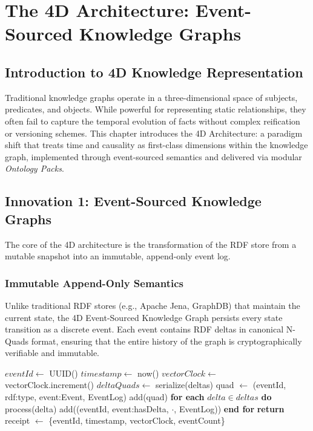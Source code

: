 \chapter{The 4D Architecture: Event-Sourced Knowledge Graphs}
\label{ch:architecture_4d}

\section{Introduction to 4D Knowledge Representation}

Traditional knowledge graphs operate in a three-dimensional space of subjects, predicates, and objects. While powerful for representing static relationships, they often fail to capture the temporal evolution of facts without complex reification or versioning schemes. This chapter introduces the 4D Architecture: a paradigm shift that treats time and causality as first-class dimensions within the knowledge graph, implemented through event-sourced semantics and delivered via modular \textit{Ontology Packs}.

\section{Innovation 1: Event-Sourced Knowledge Graphs}

The core of the 4D architecture is the transformation of the RDF store from a mutable snapshot into an immutable, append-only event log.

\subsection{Immutable Append-Only Semantics}
Unlike traditional RDF stores (e.g., Apache Jena, GraphDB) that maintain the current state, the 4D Event-Sourced Knowledge Graph persists every state transition as a discrete event. Each event contains RDF deltas in canonical N-Quads format, ensuring that the entire history of the graph is cryptographically verifiable and immutable.

\begin{algorithm}
\caption{Append Event with RDF Deltas}
\begin{algorithmic}
  \State $eventId \gets$ UUID()
  \State $timestamp \gets$ now() 
  \State $vectorClock \gets$ vectorClock.increment()
  \State $deltaQuads \gets$ serialize(deltas) 
  \State quad $\gets$ (eventId, rdf:type, event:Event, EventLog)
  \State add(quad) 
  \State \textbf{for each} $delta \in deltas$ \textbf{do}
    \State process(delta) 
    \State add((eventId, event:hasDelta, $\cdot$, EventLog))
  \State \textbf{end for}
  \State \textbf{return} receipt $\gets$ \{eventId, timestamp, vectorClock, eventCount\}
\end{algorithmic}
\end{algorithm}

